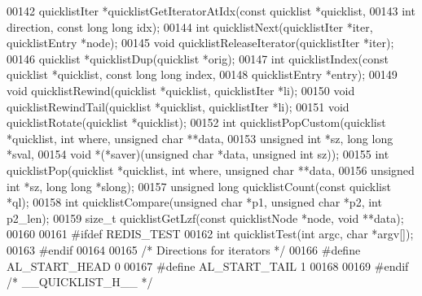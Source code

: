 \begin{DoxyCode}
00142 quicklistIter *quicklistGetIteratorAtIdx(\textcolor{keyword}{const} quicklist *quicklist,
00143                                          \textcolor{keywordtype}{int} direction, \textcolor{keyword}{const} \textcolor{keywordtype}{long} \textcolor{keywordtype}{long} idx);
00144 \textcolor{keywordtype}{int} quicklistNext(quicklistIter *iter, quicklistEntry *node);
00145 \textcolor{keywordtype}{void} quicklistReleaseIterator(quicklistIter *iter);
00146 quicklist *quicklistDup(quicklist *orig);
00147 \textcolor{keywordtype}{int} quicklistIndex(\textcolor{keyword}{const} quicklist *quicklist, \textcolor{keyword}{const} \textcolor{keywordtype}{long} \textcolor{keywordtype}{long} index,
00148                    quicklistEntry *entry);
00149 \textcolor{keywordtype}{void} quicklistRewind(quicklist *quicklist, quicklistIter *li);
00150 \textcolor{keywordtype}{void} quicklistRewindTail(quicklist *quicklist, quicklistIter *li);
00151 \textcolor{keywordtype}{void} quicklistRotate(quicklist *quicklist);
00152 \textcolor{keywordtype}{int} quicklistPopCustom(quicklist *quicklist, \textcolor{keywordtype}{int} where, \textcolor{keywordtype}{unsigned} \textcolor{keywordtype}{char} **data,
00153                        \textcolor{keywordtype}{unsigned} \textcolor{keywordtype}{int} *sz, \textcolor{keywordtype}{long} \textcolor{keywordtype}{long} *sval,
00154                        \textcolor{keywordtype}{void} *(*saver)(\textcolor{keywordtype}{unsigned} \textcolor{keywordtype}{char} *data, \textcolor{keywordtype}{unsigned} \textcolor{keywordtype}{int} sz));
00155 \textcolor{keywordtype}{int} quicklistPop(quicklist *quicklist, \textcolor{keywordtype}{int} where, \textcolor{keywordtype}{unsigned} \textcolor{keywordtype}{char} **data,
00156                  \textcolor{keywordtype}{unsigned} \textcolor{keywordtype}{int} *sz, \textcolor{keywordtype}{long} \textcolor{keywordtype}{long} *slong);
00157 \textcolor{keywordtype}{unsigned} \textcolor{keywordtype}{long} quicklistCount(\textcolor{keyword}{const} quicklist *ql);
00158 \textcolor{keywordtype}{int} quicklistCompare(\textcolor{keywordtype}{unsigned} \textcolor{keywordtype}{char} *p1, \textcolor{keywordtype}{unsigned} \textcolor{keywordtype}{char} *p2, \textcolor{keywordtype}{int} p2\_len);
00159 size\_t quicklistGetLzf(\textcolor{keyword}{const} quicklistNode *node, \textcolor{keywordtype}{void} **data);
00160 
00161 \textcolor{preprocessor}{#}\textcolor{preprocessor}{ifdef} \textcolor{preprocessor}{REDIS\_TEST}
00162 \textcolor{keywordtype}{int} quicklistTest(\textcolor{keywordtype}{int} argc, \textcolor{keywordtype}{char} *argv[]);
00163 \textcolor{preprocessor}{#}\textcolor{preprocessor}{endif}
00164 
00165 \textcolor{comment}{/* Directions for iterators */}
00166 \textcolor{preprocessor}{#}\textcolor{preprocessor}{define} \textcolor{preprocessor}{AL\_START\_HEAD} 0
00167 \textcolor{preprocessor}{#}\textcolor{preprocessor}{define} \textcolor{preprocessor}{AL\_START\_TAIL} 1
00168 
00169 \textcolor{preprocessor}{#}\textcolor{preprocessor}{endif} \textcolor{comment}{/* \_\_QUICKLIST\_H\_\_ */}
\end{DoxyCode}
